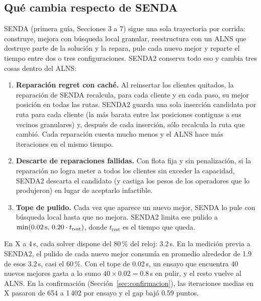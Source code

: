 \documentclass[11pt,a4paper]{article}
\newcommand{\senda}{SENDA}
\newcommand{\sendados}{SENDA2}
\begin{document}
\subsection{Qué cambia respecto de \senda}

\senda{} (primera guía, Secciones 3 a 7) sigue una sola trayectoria por corrida: construye, mejora con
búsqueda local granular, reestructura con un ALNS que destruye parte de la solución y la repara, pule
cada nuevo mejor y reparte el tiempo entre dos o tres configuraciones. \sendados{} conserva todo eso y
cambia tres cosas dentro del ALNS:

\begin{enumerate}[leftmargin=1.5em,label=(\alph*)]
\item \textbf{Reparación regret con caché.} Al reinsertar los clientes quitados, la reparación de
\senda{} recalcula, para cada cliente y en cada paso, su mejor posición en todas las rutas. \sendados{}
guarda una sola inserción candidata por ruta para cada cliente (la más barata entre las posiciones
contiguas a sus vecinos granulares) y, después de cada inserción, sólo recalcula la ruta que cambió.
Cada reparación cuesta mucho menos y el ALNS hace más iteraciones en el mismo tiempo.
\item \textbf{Descarte de reparaciones fallidas.} Con flota fija y sin penalización, si la reparación
no logra meter a todos los clientes sin exceder la capacidad, \sendados{} descarta el candidato (y
castiga los pesos de los operadores que lo produjeron) en lugar de aceptarlo infactible.
\item \textbf{Tope de pulido.} Cada vez que aparece un nuevo mejor, \senda{} lo pule con búsqueda
local hasta que no mejora. \sendados{} limita ese pulido a $\min(0.02\text{\,s},\,0.20\cdot t_{\text{rest}})$,
donde $t_{\text{rest}}$ es el tiempo que queda.
\end{enumerate}

\begin{ejemplo}
En X a 4\,s, cada solver dispone del 80\,\% del reloj: 3.2\,s. En la medición previa a \sendados{}, el
pulido de cada nuevo mejor consumía en promedio alrededor de 1.9 de esos 3.2\,s, casi el 60\,\%. Con el
tope de 0.02\,s, un ensayo que encuentra 40 nuevos mejores gasta a lo sumo $40 \times 0.02 = 0.8$\,s en
pulir, y el resto vuelve al ALNS. En la confirmación (Sección~\ref{sec:confirmacion}), las iteraciones
medias en X pasaron de 654 a 1\,402 por ensayo y el gap bajó 0.59 puntos.
\end{ejemplo}
\end{document}
